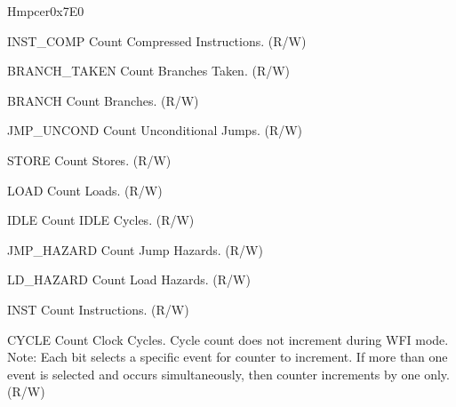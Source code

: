 \begin{register}{H}{mpcer}{0x7E0}\label{regdesc:MPCER}
%
%
%
%
%
%
%
%
%
%
%
%
\regnewline%
\begin{regdesc}\begin{reglist}
\label{fielddesc:INST_COMP}\item [INST\_COMP] Count Compressed Instructions. (R/W)
\label{fielddesc:BRANCH_TAKEN}\item [BRANCH\_TAKEN] Count Branches Taken. (R/W)  
\label{fielddesc:BRANCH}\item [BRANCH] Count Branches. (R/W) 
\label{fielddesc:JUMP_UNCONDITIONAL}\item [JMP\_UNCOND] Count Unconditional Jumps. (R/W) 
\label{fielddesc:STORE}\item [STORE] Count Stores. (R/W) 
\label{fielddesc:LOAD}\item  [LOAD] Count Loads. (R/W) 
\label{fielddesc:IDLE}\item  [IDLE] Count IDLE Cycles. (R/W) 
\label{fielddesc:JUMP_HAZARDS}\item  [JMP\_HAZARD] Count Jump Hazards. (R/W) 
\label{fielddesc:LOAD_HAZARDS}\item  [LD\_HAZARD] Count Load Hazards. (R/W) 
\label{fielddesc:INSTRUCTION}\item  [INST] Count Instructions. (R/W) 
\label{fielddesc:CYCLES}\item  [CYCLE] Count Clock Cycles. Cycle count does not increment during WFI mode.\\
Note: Each bit selects a specific event for counter to increment. If more than one event is selected and occurs simultaneously, then counter increments by one only.\\
(R/W)

\end{reglist}\end{regdesc}
\end{register}

